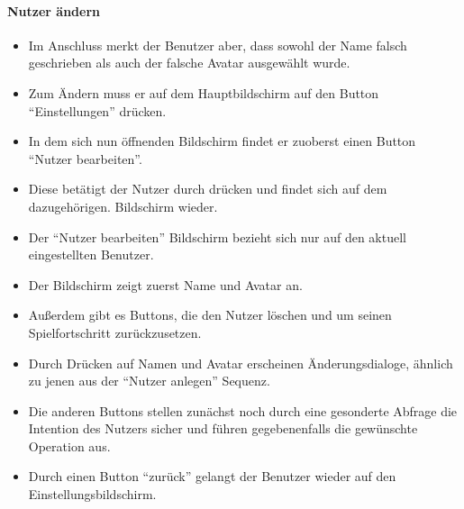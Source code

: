 \paragraph{Nutzer ändern}
\begin{itemize}
\item Im Anschluss merkt der Benutzer aber, dass sowohl der Name falsch geschrieben
als auch der falsche Avatar ausgewählt wurde.
\item Zum Ändern muss er auf dem Hauptbildschirm auf den Button "`Einstellungen"' drücken.
\item In dem sich nun öffnenden Bildschirm findet er zuoberst einen Button "`Nutzer bearbeiten"'.
\item Diese betätigt der Nutzer durch drücken und findet sich auf dem dazugehörigen.
Bildschirm wieder. 
\item Der "`Nutzer bearbeiten"' Bildschirm bezieht sich nur auf den aktuell eingestellten Benutzer.
\item Der Bildschirm zeigt zuerst Name und Avatar an.
\item Außerdem gibt es Buttons, die den Nutzer löschen und um seinen Spielfortschritt
zurückzusetzen. 
\item Durch Drücken auf Namen und Avatar erscheinen Änderungsdialoge,
ähnlich zu jenen aus der "`Nutzer anlegen"' Sequenz.
\item Die anderen Buttons stellen zunächst noch durch eine gesonderte Abfrage die Intention des 
Nutzers sicher und führen gegebenenfalls die gewünschte Operation aus.
\item Durch einen Button "`zurück"' gelangt der Benutzer wieder auf den Einstellungsbildschirm.
\end{itemize}
